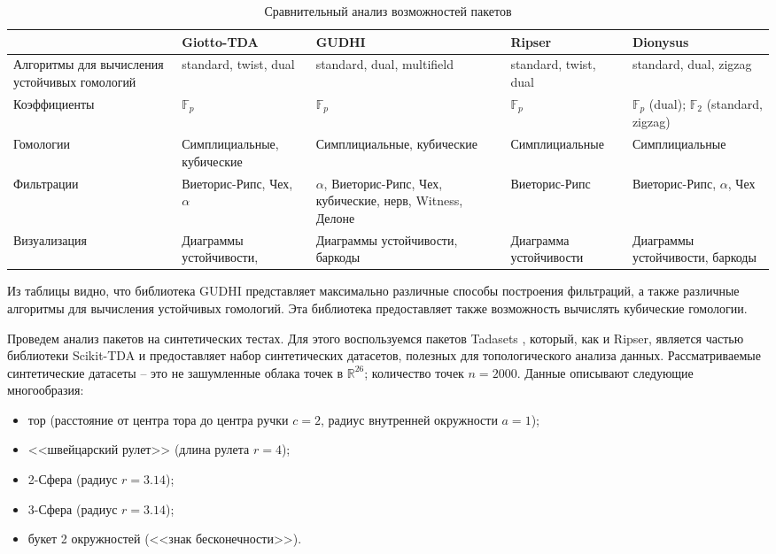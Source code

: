\begin{table}[!htbp]
	\centering
	\small
	\caption{Сравнительный анализ возможностей пакетов}	
	\begin{tabularx}{\linewidth}{|X|X|X|X|X|}
		\hline
		& Giotto-TDA & GUDHI & Ripser& Dionysus\\ \hline
		Алгоритмы для вычисления  устойчивых гомологий & standard, twist, dual& standard, dual, multifield & standard, twist, dual & standard, dual, zigzag \\ \hline
		Коэффициенты & $\mathbb{F}_p$ & $\mathbb{F}_p$ & $\mathbb{F}_p$ & $\mathbb{F}_p$ (dual);  $\mathbb{F}_2$ (standard, zigzag) \\ \hline
		Гомологии & Симплициальные, кубические& Симплициальные, кубические & Симплициальные & Симплициальные \\ \hline
		Фильтрации  & Виеторис-Рипс, Чех, $\alpha$ & $\alpha$, Виеторис-Рипс, Чех, кубические, нерв, Witness, Делоне& Виеторис-Рипс  & Виеторис-Рипс, $\alpha$, Чех\\ \hline
		Визуализация & Диаграммы устойчивости, & Диаграммы устойчивости, баркоды &Диаграмма устойчивости & Диаграммы устойчивости, баркоды \\ \hline
	\end{tabularx}
\label{tabl:packages}
\end{table}

Из таблицы видно, что библиотека GUDHI представляет максимально различные способы построения фильтраций, а также различные алгоритмы для вычисления устойчивых гомологий. Эта библиотека предоставляет также возможность вычислять кубические гомологии.

Проведем анализ пакетов на синтетических тестах. Для этого воспользуемся пакетов Tadasets \cite{Tadasets}, который, как и Ripser, является частью библиотеки Scikit-TDA \cite{scikit} и предоставляет набор синтетических датасетов, полезных для топологического анализа данных. Рассматриваемые синтетические датасеты -- это не зашумленные облака точек в $\mathbb{R}^{26}$; количество точек $n=2000$. Данные описывают следующие многообразия:
\begin{itemize}
	\item тор (расстояние от центра тора до центра ручки $c=2$, радиус внутренней окружности $a=1$);
	\item <<швейцарский рулет>> (длина рулета $r=4$);
	\item 2-Сфера (радиус $r=3.14$);
	\item 3-Сфера (радиус $r=3.14$);
	\item букет 2 окружностей (<<знак бесконечности>>).
\end{itemize}

